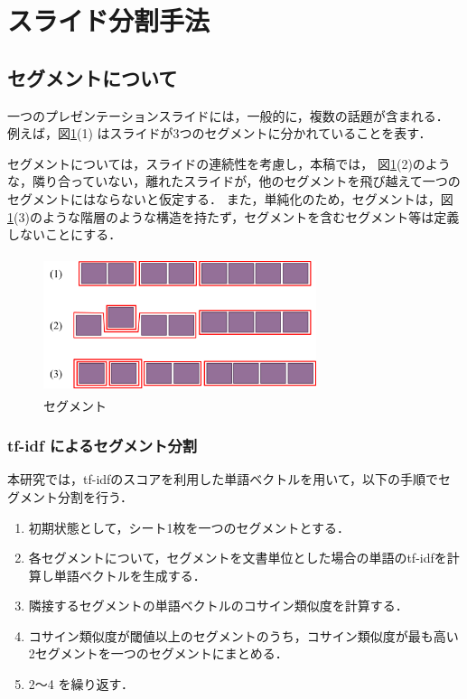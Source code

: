 \documentclass{js}
\begin{document}
\section{スライド分割手法}

\subsection{セグメントについて}

一つのプレゼンテーションスライドには，一般的に，複数の話題が含まれる．
例えば，図\ref{fig:segment}(1) はスライドが3つのセグメントに分かれていることを表す．

セグメントについては，スライドの連続性を考慮し，本稿では，
図\ref{fig:segment}(2)のような，隣り合っていない，離れたスライドが，他のセグメントを飛び越えて一つのセグメントにはならないと仮定する．
また，単純化のため，セグメントは，図\ref{fig:segment}(3)のような階層のような構造を持たず，セグメントを含むセグメント等は定義しないことにする．

\begin{figure}[tb]
 \begin{center}
  \includegraphics[width=80mm,height=40mm]{slide_segment.png}
 \end{center}
 \caption{セグメント}
 \label{fig:segment}
\end{figure}


\subsubsection{tf-idf によるセグメント分割}

本研究では，tf-idfのスコアを利用した単語ベクトルを用いて，以下の手順でセグメント分割を行う．

\begin{enumerate}
 \item 初期状態として，シート1枚を一つのセグメントとする．
 \item 各セグメントについて，セグメントを文書単位とした場合の単語のtf-idfを計算し単語ベクトルを生成する．
 \item 隣接するセグメントの単語ベクトルのコサイン類似度を計算する．
 \item コサイン類似度が閾値以上のセグメントのうち，コサイン類似度が最も高い2セグメントを一つのセグメントにまとめる．
 \item 2〜4 を繰り返す．
\end{enumerate}
\end{document}
